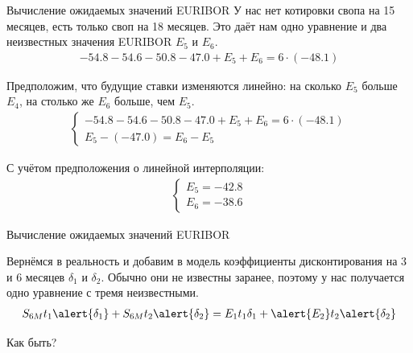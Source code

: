 \documentclass{beamer}
\begin{document}
\begin{frame}{Вычисление ожидаемых значений EURIBOR}
\justify
У нас нет котировки свопа на 15 месяцев, есть только своп на 18 месяцев. Это даёт нам одно уравнение и два неизвестных значения EURIBOR $E_5$ и $E_6$.
\begin{align*}
-54.8-54.6-50.8-47.0+E_5+E_6 = 6\cdot(-48.1)
\end{align*}

\justify
Предположим, что будущие ставки изменяются линейно: на сколько $E_5$ больше $E_4$, на столько же $E_6$ больше, чем $E_5$.
\begin{align*}
\begin{cases}
-54.8-54.6-50.8-47.0+E_5+E_6 = 6\cdot(-48.1) \\
E_5 - (-47.0) = E_6 - E_5
\end{cases}
\end{align*}

С учётом предположения о линейной интерполяции:
\begin{align*}
\begin{cases}
E_5 = -42.8 \\
E_6 = -38.6
\end{cases}
\end{align*}
\end{frame}



\begin{frame}{Вычисление ожидаемых значений EURIBOR}
\centering
{}

\justify
Вернёмся в реальность и добавим в модель коэффициенты дисконтирования на 3 и 6 месяцев $\delta_1$ и $\delta_2$. Обычно они не известны заранее, поэтому у нас получается одно уравнение с тремя неизвестными.
\begin{align*}
S_{6M}t_1\alert{\delta_1} + S_{6M}t_2\alert{\delta_2} = E_1t_1\delta_1 + \alert{E_2}t_2\alert{\delta_2}
\end{align*}

\justify
Как быть?
\end{frame}
\end{document}
